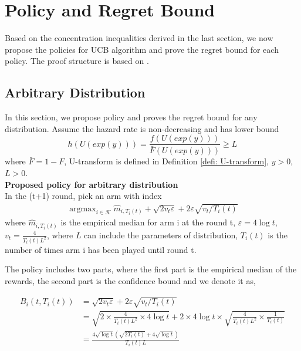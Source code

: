 \documentclass{article}
\DeclareMathOperator*{\argmax}{argmax}
\theoremstyle{plain}
\begin{document}
    
    
\section{Policy and Regret Bound}

Based on the concentration inequalities derived in the last section, we now propose the policies for UCB algorithm and prove the regret bound for each policy. The proof structure is based on \cite{Auer2002}.

\subsection{Arbitrary Distribution}

In this section, we propose policy and proves the regret bound for any distribution. Assume the hazard rate is non-decreasing and has lower bound 
$$h\left(U(exp(y))\right) = \frac{f\left(U(exp(y))\right)}{\bar{F}\left(U(exp(y))\right) } \geq L$$
where $\bar{F} = 1 - F$, U-transform is defined in Definition \ref{defi: U-transform}, $y > 0$, $L > 0$. \\

\textbf{Proposed policy for arbitrary distribution}\\

In the (t+1) round, pick an arm with index 
\begin{align}
   \label{policy abr}
   \argmax_{i \in \mathcal{K}} \hat{m}_{i, T_i(t)} + \sqrt{2v_t \varepsilon} + 2 \varepsilon \sqrt{v_t/T_i(t)}
\end{align}
where $\hat{m}_{i, T_i(t)}$ is the empirical median for arm i at the round t, $\varepsilon = 4 \log t$, $v_t = \frac{4 }{T_i(t) L^2}$, where $L$ can include the parameters of distribution, $T_i(t)$ is the number of times arm i has been played until round t.  

The policy includes two parts, where the first part is the empirical median of the rewards, the second part is the confidence bound and we denote it as,

\begin{align}
\label{B_i(i, T_i(t)) definition for arb}
B_i(t, T_i(t)) &= \sqrt{2v_t \varepsilon} + 2 \varepsilon \sqrt{v_t/T_i(t)}\\
&= \sqrt{2 \times \frac{4 }{T_i(t) L^2} \times 4 \log t} + 2 \times 4 \log t \times \sqrt{\frac{4 }{T_i(t) L^2} \times \frac{1}{T_i(t)}}\\
&= \frac{4 \sqrt{\log t} ( \sqrt{ 2T_i(t)} + 4\sqrt{\log t})}{T_i(t) L}
\end{align}
\end{document}
